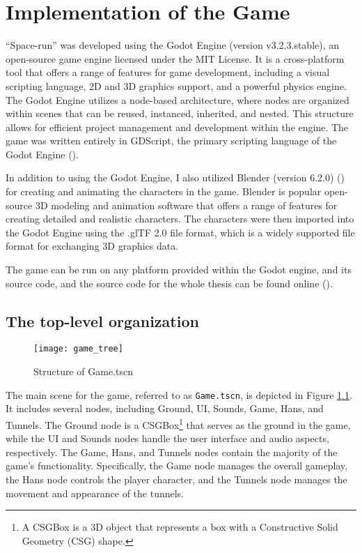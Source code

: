 \chapter{Implementation of the Game}
``Space-run'' was developed using the Godot Engine (version v3.2.3.stable), an open-source game engine licensed under the MIT License. It is a cross-platform tool that offers a range of features for game development, including a visual scripting language, 2D and 3D graphics support, and a powerful physics engine. The Godot Engine utilizes a node-based architecture, where nodes are organized within scenes that can be reused, instanced, inherited, and nested. This structure allows for efficient project management and development within the engine. The game was written entirely in GDScript, the primary scripting language of the Godot Engine (\cite{GodotDocs}).

In addition to using the Godot Engine, I also utilized Blender (version 6.2.0) (\cite{blender}) for creating and animating the characters in the game. Blender is popular open-source 3D modeling and animation software that offers a range of features for creating detailed and realistic characters. The characters were then imported into the Godot Engine using the .glTF 2.0 \cite{gltf} file format, which is a widely supported file format for exchanging 3D graphics data.

The game can be run on any platform provided within the Godot engine, and its source code, and the source code for the whole thesis can be found online (\cite{spacerunai}).

\section{The top-level organization}
\begin{figure}[h]
    \centering
    \texttt{[image: game\_tree]}
    \caption{Structure of Game.tscn}
    \label{fig:game_tree}
\end{figure}

The main scene for the game, referred to as \texttt{Game.tscn}, is depicted in Figure \ref{fig:game_tree}. It includes several nodes, including Ground, UI, Sounds, Game, Hans, and Tunnels. The Ground node is a CSGBox\footnote{A CSGBox is a 3D object that represents a box with a Constructive Solid Geometry (CSG) shape.} that serves as the ground in the game, while the UI and Sounds nodes handle the user interface and audio aspects, respectively. The Game, Hans, and Tunnels nodes contain the majority of the game's functionality. Specifically, the Game node manages the overall gameplay, the Hans node controls the player character, and the Tunnels node manages the movement and appearance of the tunnels.

